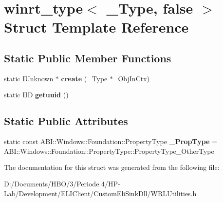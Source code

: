 \hypertarget{structwinrt__type_3_01___type_00_01false_01_4}{}\section{winrt\+\_\+type$<$ \+\_\+\+Type, false $>$ Struct Template Reference}
\label{structwinrt__type_3_01___type_00_01false_01_4}
\subsection*{Static Public Member Functions}
\begin{DoxyCompactItemize}
\item 
\mbox{\label{structwinrt__type_3_01___type_00_01false_01_4_ad6cb1c8c1d9669b3cf307a9ec82313ed}} 
static I\+Unknown $\ast$ {\bfseries create} (\+\_\+\+Type $\ast$\+\_\+\+Obj\+In\+Ctx)
\item 
\mbox{\label{structwinrt__type_3_01___type_00_01false_01_4_ab25b5ff5c11eeac8d7585952fed9b5d2}} 
static I\+ID {\bfseries getuuid} ()
\end{DoxyCompactItemize}
\subsection*{Static Public Attributes}
\begin{DoxyCompactItemize}
\item 
\mbox{\label{structwinrt__type_3_01___type_00_01false_01_4_a42fe34dbcae9fc0e9280780f70c1b058}} 
static const A\+B\+I\+::\+Windows\+::\+Foundation\+::\+Property\+Type {\bfseries \+\_\+\+Prop\+Type} = A\+B\+I\+::\+Windows\+::\+Foundation\+::\+Property\+Type\+::\+Property\+Type\+\_\+\+Other\+Type
\end{DoxyCompactItemize}


The documentation for this struct was generated from the following file\+:\begin{DoxyCompactItemize}
\item 
D\+:/\+Documents/\+H\+B\+O/3/\+Periode 4/\+H\+P-\/\+Lab/\+Development/\+E\+L\+I\+Client/\+Custom\+Eli\+Sink\+Dll/W\+R\+L\+Utilities.\+h\end{DoxyCompactItemize}
